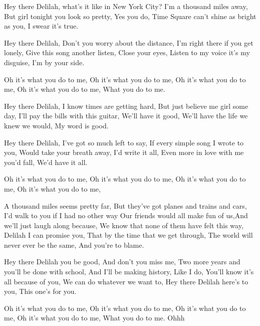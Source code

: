 \resetVars%
%
%
%
%
\makeheader%
\lyrics%

 Hey there Delilah, what's it like in New York City?
I'm a thousand miles away, But girl tonight you look so pretty,
Yes you do, Time Square can't shine as bright as you,
I swear it's true.

Hey there Delilah, Don't you worry about the distance,
I'm right there if you get lonely, Give this song another listen,
Close your eyes, Listen to my voice it's my disguise,
I'm by your side.

Oh it's what you do to me, Oh it's what you do to me,
Oh it's what you do to me, Oh it's what you do to me,
What you do to me.

Hey there Delilah, I know times are getting hard,
But just believe me girl some day, I'll pay the bills with this guitar,
We'll have it good, We'll have the life we knew we would,
My word is good.

Hey there Delilah, I've got so much left to say,
If every simple song I wrote to you, Would take your breath away,
I'd write it all, Even more in love with me you'd fall,
We'd have it all.

Oh it's what you do to me, Oh it's what you do to me,
Oh it's what you do to me, Oh it's what you do to me,

\continuechords
{}A thousand miles seems pretty far,  But they've got planes and trains and cars,
I'd walk to you if I had no other way
Our friends would all make fun of us,And we'll just laugh along because,
We know that none of them have felt this way,
Delilah I can promise you, That by the time that we get through,
The world will never ever be the same,  And you're to blame.

Hey there Delilah you be good, And don't you miss me,
Two more years and you'll be done with school, And I'll be making history,
Like I do, You'll know it's all because of you,
We can do whatever we want to,
Hey there Delilah here's to you, This one's for you.

Oh it's what you do to me, Oh it's what you do to me,
Oh it's what you do to me, Oh it's what you do to me,
What you do to me.
Ohhh

\next

